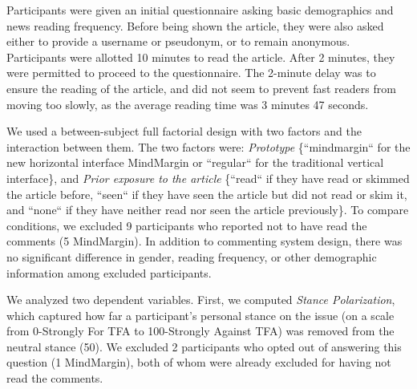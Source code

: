 Participants were given an initial questionnaire asking basic demographics and news reading frequency. Before being shown the article, they were also asked either to provide a username or pseudonym, or to remain anonymous. Participants were allotted 10 minutes to read the article. After 2 minutes, they were permitted to proceed to the questionnaire. The 2-minute delay was to ensure the reading of the article, and did not seem to prevent fast readers from moving too slowly, as the average reading time was 3 minutes 47 seconds. 


We used a between-subject full factorial design with two factors and the interaction between them. The two factors were: {\it Prototype} \{``mindmargin`` for the new horizontal interface MindMargin or ``regular`` for the traditional vertical interface\}, and {\it Prior exposure to the article} \{``read`` if they have read or skimmed the article before, ``seen`` if they have seen the article but did not read or skim it, and ``none`` if they have neither read nor seen the article previously\}. To compare conditions, we excluded 9 participants who reported not to have read the comments (5 MindMargin). In addition to commenting system design, there was no significant difference in gender, reading frequency, or other demographic information among excluded participants.

We analyzed two dependent variables.  First, we computed {\it Stance Polarization}, which captured how far a participant's personal stance on the issue (on a scale from 0-Strongly For TFA to 100-Strongly Against TFA) was removed from the neutral stance (50).  We excluded 2 participants who opted out of answering this question (1 MindMargin), both of whom were already excluded for having not read the comments.



